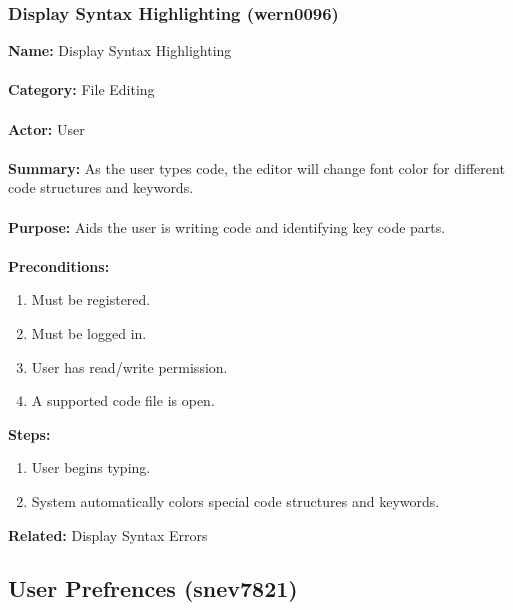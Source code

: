 \documentclass[11pt]{report}
\begin{document}
\subsubsection{Display Syntax Highlighting (wern0096)}
\begin{framed}
	\noindent\textbf{Name:} Display Syntax Highlighting \\ \\
	\textbf{Category:} File Editing \\ \\
	\textbf{Actor:} User \\ \\
	\textbf{Summary:} As the user types code, the editor will change font color for different code structures and keywords. \\ \\
	\textbf{Purpose:} Aids the user is writing code and identifying key code parts. \\ \\
	\textbf{Preconditions:} 
	\begin{enumerate}
		\item Must be registered.
		\item Must be logged in.
		\item User has read/write permission.
		\item A supported code file is open.
	\end{enumerate}
	\textbf{Steps:}
	\begin{enumerate}
		\item User begins typing.
		\item System automatically colors special code structures and keywords.
	\end{enumerate}
	\textbf{Related:} Display Syntax Errors
\end{framed}

\newpage

\subsection{User Prefrences (snev7821)}
\end{document}
